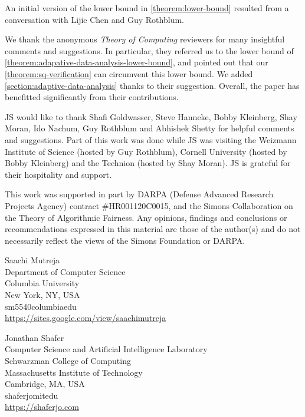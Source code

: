 \documentclass{toc}
\begin{document}
{\small
	An initial version of the lower bound in \cref{theorem:lower-bound} resulted from a conversation with Lijie Chen and Guy Rothblum. 

	We thank the anonymous \emph{Theory of Computing} reviewers for many insightful comments and suggestions. In particular, they referred us to the lower bound of \cref{theorem:adapative-data-analysis-lower-bound}, and pointed out that our \cref{theorem:sq-verification} can circumvent this lower bound. We added \cref{section:adaptive-data-analysis} thanks to their suggestion. Overall, the paper has benefitted significantly from their contributions.

	JS would like to thank 
	Shafi Goldwasser,
	Steve Hanneke,
	Bobby Kleinberg,
	Shay Moran,
	Ido Nachum,
	Guy Rothblum
	and
	Abhishek Shetty
	for helpful comments and suggestions. Part of this work was done while JS was visiting the Weizmann Institute of Science (hosted by Guy Rothblum), Cornell University (hosted by Bobby Kleinberg) and the Technion (hosted by Shay Moran). JS is grateful for their hospitality and support.

	This work was supported in part by DARPA (Defense Advanced Research Projects Agency) contract \#HR001120C0015, and the Simons Collaboration on the Theory of Algorithmic Fairness. Any opinions, findings and conclusions or recommendations expressed in this material are those of the author(s) and do not necessarily reflect the views of the Simons Foundation or DARPA.
}

%

 
%
%



%
%
%
%
%
\begin{tocauthors}
\begin{tocinfo}[mutreja]
 Saachi Mutreja\\
 Department of Computer Science\\
 Columbia University\\ %
 New York, NY, USA\\
  sm5540\tocat{}columbia\tocdot{}edu \\    %
  \url{https://sites.google.com/view/saachimutreja} %
\end{tocinfo}
\begin{tocinfo}[shafer]
  Jonathan Shafer\\
  Computer Science and Artificial Intelligence Laboratory\\
  Schwarzman College of Computing\\
  Massachusetts Institute of Technology\\
  Cambridge, MA, USA\\
  shaferjo\tocat{}mit\tocdot{}edu \\
  \url{https://shaferjo.com}
\end{tocinfo}
\end{tocauthors}
\end{document}
